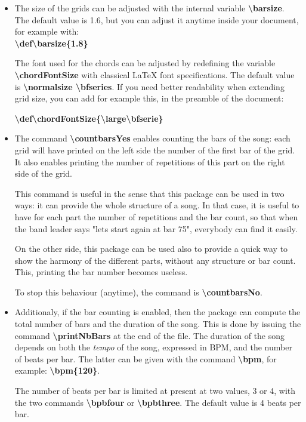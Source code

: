 \documentclass[11pt]{article}
\newcommand{\btt}{\bfseries \ttfamily }
\newcommand{\tbs}{\textbackslash{}}
\begin{document}
\begin{itemize}

\item The size of the grids can be adjusted with the internal variable 
{\btt \tbs barsize}.
The default value is 1.6, but you can adjust it anytime inside your document, for example with:\\
{\btt \tbs def\tbs barsize\{1.8\}}

The font used for the chords can be adjusted by redefining the variable {\btt \tbs chordFontSize} with classical \LaTeX{} font specifications.
The default value is {\btt \tbs normalsize \tbs bfseries}.
If you need better readability when extending grid size, you can add for example this, in the preamble of the document:

{\btt \tbs def\tbs chordFontSize\{\tbs large\tbs bfserie\}}


\item The command {\btt \tbs countbarsYes} enables counting the bars of the song:
each grid will have printed on the left side the number of the first bar of the grid.
It also enables printing the number of repetitions of this part on the right side of the grid.

This command is useful in the sense that this package can be used in two ways:
it can provide the whole structure of a song.
In that case, it is useful to have for each part the number of repetitions and the bar count, so that when the band leader says "lets start again at bar 75", everybody can find it easily.

On the other side, this package can be used also to provide a quick way to show the harmony of the different parts, without any structure or bar count.
This, printing the bar number becomes useless.

To stop this behaviour (anytime), the command is {\btt \tbs countbarsNo}.

\item Additionaly, if the bar counting is enabled, then the package can compute the total number of bars and the duration of the song.
This is done by issuing the command {\btt \tbs printNbBars} at the end of the file.
The duration of the song depends on both the {\em tempo} of the song, expressed in BPM, and the number of beats per bar.
The latter can be given with the command {\btt \tbs bpm}, for example:
{\btt \tbs bpm\{120\}}.

The number of beats per bar is limited at present at two values, 3 or 4, with the two commands
{\btt \tbs bpbfour} or {\btt \tbs bpbthree}.
The default value is 4 beats per bar.


\end{itemize}
\end{document}
